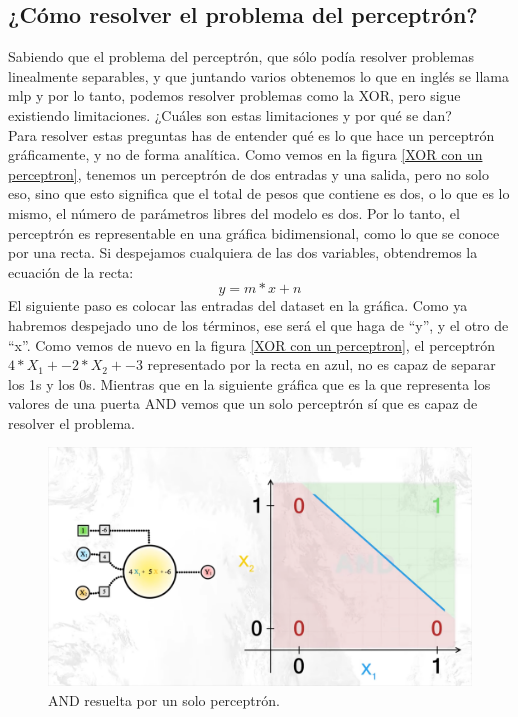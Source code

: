 \subsection{¿Cómo resolver el problema del perceptrón?}
Sabiendo que el problema del perceptrón, que sólo podía resolver problemas linealmente separables, y que juntando varios obtenemos lo que en inglés se llama \gls{mlp} y por lo tanto, podemos resolver problemas como la XOR, pero sigue existiendo limitaciones. ¿Cuáles son estas limitaciones y por qué se dan?
\\
Para resolver estas preguntas has de entender qué es lo que hace un perceptrón gráficamente, y no de forma analítica. Como vemos en la figura \ref{XOR con un perceptron}, tenemos un perceptrón de dos entradas y una salida, pero no solo eso, sino que esto significa que el total de pesos que contiene es dos, o lo que es lo mismo, el número de parámetros libres del modelo es dos. Por lo tanto, el perceptrón es representable en una gráfica bidimensional, como lo que se conoce por una recta. Si despejamos cualquiera de las dos variables, obtendremos la ecuación de la recta:
\begin{equation}
	y = m*x + n
\end{equation}
El siguiente paso es colocar las entradas del dataset en la gráfica. Como ya habremos despejado uno de los términos, ese será el que haga de ``y'', y el otro de ``x''. Como vemos de nuevo en la figura \ref{XOR con un perceptron}, el perceptrón $4*X_1 + -2*X_2 + -3$ representado por la recta en azul, no es capaz de separar los 1s y los 0s. Mientras que en la siguiente gráfica que es la que representa los valores de una puerta AND vemos que un solo perceptrón sí que es capaz de resolver el problema.
\begin{figure}[h]
	\centering
	\includegraphics[width=15cm]{archivos/imagenes/perceptron-con-and.png}
	\caption[AND resuelta por un solo perceptrón.]{AND resuelta por un solo perceptrón\footnotemark.}
\end{figure}

